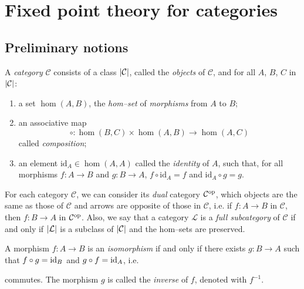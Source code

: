 \section{Fixed point theory for categories}

\subsection{Preliminary notions}

\begin{dfn}
  A \emph{category} \(\mathcal{C}\) consists of a class \(\lvert \mathcal{C} \rvert\), called the \emph{objects} of \(\mathcal{C}\), and for all \(A\), \(B\), \(C\) in \(\lvert \mathcal{C} \rvert\):
  \begin{enumerate}
    \item a set \(\hom(A,B)\), the \emph{hom--set} of \emph{morphisms} from \(A\) to \(B\);
    \item an associative map
    \begin{equation}
      \circ \colon \hom(B,C) \times \hom(A,B) \to \hom(A,C)
    \end{equation}
    called \emph{composition};
    \item an element \(\mathrm{id}_A \in \hom(A,A)\) called the \emph{identity} of \(A\), such that, for all morphisms \(f \colon A \to B\) and \(g \colon B \to A\), \(f \circ \mathrm{id}_A = f\) and \(\mathrm{id}_A \circ g = g\).
    \begin{center}
  \end{center}
  \end{enumerate}
\end{dfn}

For each category \(\mathcal{C}\), we can consider its \emph{dual} category \(\mathcal{C}^\textup{op}\), which objects are the same as those of \(\mathcal{C}\) and arrows are opposite of those in \(\mathcal{C}\), i.e. if \(f \colon A \to B\) in \(\mathcal{C}\), then \(f \colon B \to A\) in \(\mathcal{C}^\textup{op}\).
Also, we say that a category \(\mathcal{L}\) is a \emph{full subcategory} of \(\mathcal{C}\) if and only if \(\lvert \mathcal{L} \rvert\) is a subclass of \(\lvert \mathcal{C} \rvert\) and the hom--sets are preserved.

\begin{dfn}
  A morphism \(f \colon A \to B\) is an \emph{isomorphism} if and only if there exists \(g \colon B \to A\) such that \(f \circ g = \mathrm{id}_{B}\) and \(g \circ f = \mathrm{id}_{A}\), i.e.
  \begin{center}
  \end{center}
  commutes. The morphism \(g\) is called the \emph{inverse} of \(f\), denoted with \(f^{-1}\).
\end{dfn}

